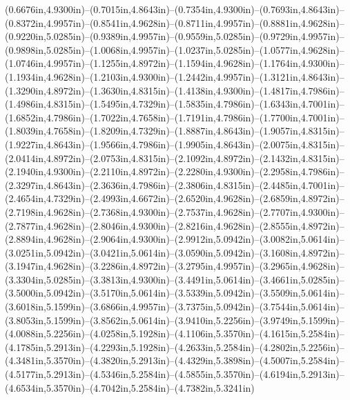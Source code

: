 (0.6676in,4.9300in)--(0.7015in,4.8643in)--(0.7354in,4.9300in)--(0.7693in,4.8643in)--(0.8372in,4.9957in)--(0.8541in,4.9628in)--(0.8711in,4.9957in)--(0.8881in,4.9628in)--(0.9220in,5.0285in)--(0.9389in,4.9957in)--(0.9559in,5.0285in)--(0.9729in,4.9957in)--(0.9898in,5.0285in)--(1.0068in,4.9957in)--(1.0237in,5.0285in)--(1.0577in,4.9628in)--(1.0746in,4.9957in)--(1.1255in,4.8972in)--(1.1594in,4.9628in)--(1.1764in,4.9300in)--(1.1934in,4.9628in)--(1.2103in,4.9300in)--(1.2442in,4.9957in)--(1.3121in,4.8643in)--(1.3290in,4.8972in)--(1.3630in,4.8315in)--(1.4138in,4.9300in)--(1.4817in,4.7986in)--(1.4986in,4.8315in)--(1.5495in,4.7329in)--(1.5835in,4.7986in)--(1.6343in,4.7001in)--(1.6852in,4.7986in)--(1.7022in,4.7658in)--(1.7191in,4.7986in)--(1.7700in,4.7001in)--(1.8039in,4.7658in)--(1.8209in,4.7329in)--(1.8887in,4.8643in)--(1.9057in,4.8315in)--(1.9227in,4.8643in)--(1.9566in,4.7986in)--(1.9905in,4.8643in)--(2.0075in,4.8315in)--(2.0414in,4.8972in)--(2.0753in,4.8315in)--(2.1092in,4.8972in)--(2.1432in,4.8315in)--(2.1940in,4.9300in)--(2.2110in,4.8972in)--(2.2280in,4.9300in)--(2.2958in,4.7986in)--(2.3297in,4.8643in)--(2.3636in,4.7986in)--(2.3806in,4.8315in)--(2.4485in,4.7001in)--(2.4654in,4.7329in)--(2.4993in,4.6672in)--(2.6520in,4.9628in)--(2.6859in,4.8972in)--(2.7198in,4.9628in)--(2.7368in,4.9300in)--(2.7537in,4.9628in)--(2.7707in,4.9300in)--(2.7877in,4.9628in)--(2.8046in,4.9300in)--(2.8216in,4.9628in)--(2.8555in,4.8972in)--(2.8894in,4.9628in)--(2.9064in,4.9300in)--(2.9912in,5.0942in)--(3.0082in,5.0614in)--(3.0251in,5.0942in)--(3.0421in,5.0614in)--(3.0590in,5.0942in)--(3.1608in,4.8972in)--(3.1947in,4.9628in)--(3.2286in,4.8972in)--(3.2795in,4.9957in)--(3.2965in,4.9628in)--(3.3304in,5.0285in)--(3.3813in,4.9300in)--(3.4491in,5.0614in)--(3.4661in,5.0285in)--(3.5000in,5.0942in)--(3.5170in,5.0614in)--(3.5339in,5.0942in)--(3.5509in,5.0614in)--(3.6018in,5.1599in)--(3.6866in,4.9957in)--(3.7375in,5.0942in)--(3.7544in,5.0614in)--(3.8053in,5.1599in)--(3.8562in,5.0614in)--(3.9410in,5.2256in)--(3.9749in,5.1599in)--(4.0088in,5.2256in)--(4.0258in,5.1928in)--(4.1106in,5.3570in)--(4.1615in,5.2584in)--(4.1785in,5.2913in)--(4.2293in,5.1928in)--(4.2633in,5.2584in)--(4.2802in,5.2256in)--(4.3481in,5.3570in)--(4.3820in,5.2913in)--(4.4329in,5.3898in)--(4.5007in,5.2584in)--(4.5177in,5.2913in)--(4.5346in,5.2584in)--(4.5855in,5.3570in)--(4.6194in,5.2913in)--(4.6534in,5.3570in)--(4.7042in,5.2584in)--(4.7382in,5.3241in) 